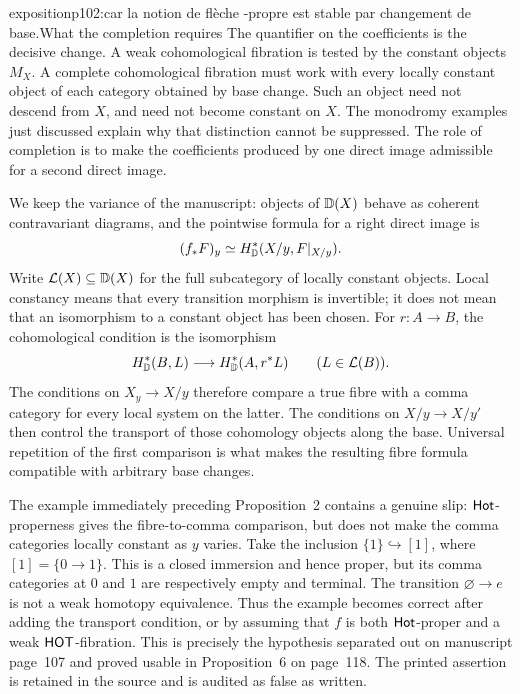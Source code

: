 \begin{dcomment}{exposition}{p102:car la notion de flèche \Hot-propre est stable par changement de base.}{What the completion requires}
The quantifier on the coefficients is the decisive change. A weak cohomological fibration is tested by the constant objects $M_X$. A complete cohomological fibration must work with every locally constant object of each category obtained by base change. Such an object need not descend from $X$, and need not become constant on $X$. The monodromy examples just discussed explain why that distinction cannot be suppressed. The role of completion is to make the coefficients produced by one direct image admissible for a second direct image.

We keep the variance of the manuscript: objects of $\mathbb{D}(X)$ behave as coherent contravariant diagrams, and the pointwise formula for a right direct image is
\[
 (f_*F)_y\simeq H^*_{\mathbb{D}}(X/y,F|_{X/y}).
\]
Write $\mathcal L(X)\subseteq\mathbb{D}(X)$ for the full subcategory of locally constant objects. Local constancy means that every transition morphism is invertible; it does not mean that an isomorphism to a constant object has been chosen. For $r:A\to B$, the cohomological condition is the isomorphism
\[
 H^*_{\mathbb{D}}(B,L)\longrightarrow H^*_{\mathbb{D}}(A,r^*L)
 \qquad(L\in\mathcal L(B)).
\]
The conditions on $X_y\to X/y$ therefore compare a true fibre with a comma category for every local system on the latter. The conditions on $X/y\to X/y'$ then control the transport of those cohomology objects along the base. Universal repetition of the first comparison is what makes the resulting fibre formula compatible with arbitrary base changes.

The example immediately preceding Proposition~2 contains a genuine slip: $\mathsf{Hot}$-properness gives the fibre-to-comma comparison, but does not make the comma categories locally constant as $y$ varies. Take the inclusion $\{1\}\hookrightarrow[1]$, where $[1]=\{0\to1\}$. This is a closed immersion and hence proper, but its comma categories at $0$ and $1$ are respectively empty and terminal. The transition $\varnothing\to e$ is not a weak homotopy equivalence. Thus the example becomes correct after adding the transport condition, or by assuming that $f$ is both $\mathsf{Hot}$-proper and a weak $\mathsf{HOT}$-fibration. This is precisely the hypothesis separated out on manuscript page~107 and proved usable in Proposition~6 on page~118. The printed assertion is retained in the source and is audited as false as written.
\end{dcomment}


